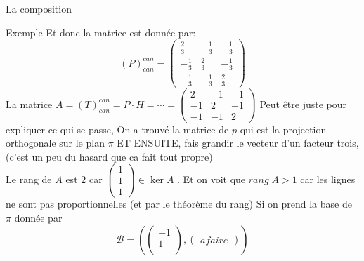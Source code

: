 \begin{parag}{La composition}
\begin{subparag}{Exemple}
        Et donc la matrice est donnée par:
\[(P)_{can}^{can} = \begin{pmatrix}
     \frac{2}{3} & -\frac{1}{3} & -\frac{1}{3}\\
      -\frac{1}{3}& \frac{2}{3} & -\frac{1}{3}\\
      -\frac{1}{3}& -\frac{1}{3} & \frac{2}{3}
\end{pmatrix}\]
La matrice $A = (T)_{can}^{can} = P \cdot H = \cdots = \begin{pmatrix}
    2 & -1 & -1 \\
    -1 & 2 & -1 \\
    -1 & -1 & 2
\end{pmatrix}$
Peut être juste pour expliquer ce qui se passe,  On a trouvé la matrice de $p$ qui est la projection orthogonale sur le plan $\pi$ ET ENSUITE, fais grandir le vecteur d'un facteur trois, (c'est un peu du hasard que ca fait tout propre)
\\
Le rang de $A$ est $2$ car $\begin{pmatrix}
    1 \\ 1 \\ 1
\end{pmatrix} \in \ker A$ . Et on voit que $rang\; A > 1$ car les lignes ne sont pas proportionnelles (et par le théorème du rang)
Si on prend la base de $\pi$ donnée par
\[\mathcal{B} = \left( \begin{pmatrix}
    -1 \\ 1 \\ 
\end{pmatrix}, \begin{pmatrix}
    a faire
\end{pmatrix}\right)\]
    \end{subparag}
\end{parag}

